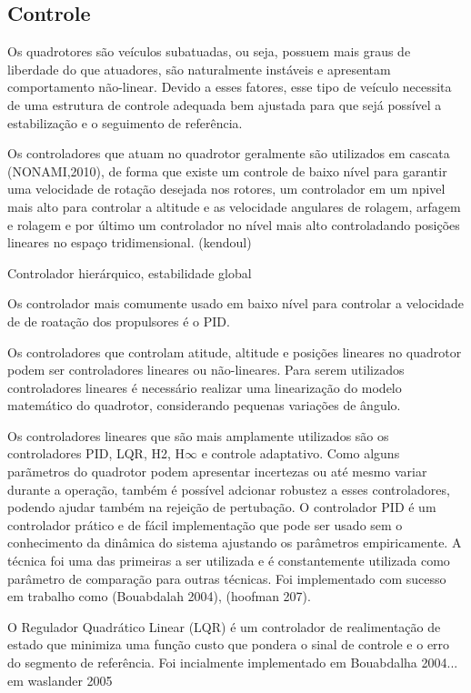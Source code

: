 \subsection{Controle}
Os quadrotores são veículos subatuadas, ou seja, possuem mais graus de liberdade do que atuadores, são naturalmente instáveis e apresentam comportamento não-linear. Devido a esses fatores, esse tipo de veículo necessita de uma estrutura de controle adequada bem ajustada para que sejá possível a estabilização e o seguimento de referência.

Os controladores que atuam no quadrotor geralmente são utilizados em cascata (NONAMI,2010), de forma que existe um controle de baixo nível para garantir uma velocidade de rotação desejada nos rotores, um controlador em um npivel mais alto para controlar a altitude e as velocidade angulares de rolagem, arfagem e rolagem e por último um controlador no nível mais alto controladando posições lineares no espaço tridimensional. (kendoul)

Controlador hierárquico, estabilidade global

Os controlador mais comumente usado em baixo nível para controlar a velocidade de de roatação dos propulsores é o PID. 

Os controladores que controlam atitude, altitude e posições lineares no quadrotor podem ser controladores lineares ou não-lineares. Para serem utilizados controladores lineares é necessário realizar uma linearização do modelo matemático do quadrotor, considerando pequenas variações de ângulo.

Os controladores lineares que são mais amplamente utilizados são os controladores PID, LQR, H2, H$\infty$ e controle adaptativo. Como alguns parãmetros do quadrotor podem apresentar incertezas ou até mesmo variar durante a operação, também é possível adcionar robustez a esses controladores, podendo ajudar também na rejeição de pertubação. O controlador PID é um controlador prático e de fácil implementação que pode ser usado sem o conhecimento da dinâmica do sistema ajustando os parâmetros empiricamente. A técnica foi uma das primeiras a ser utilizada e é constantemente utilizada como parâmetro de comparação para outras técnicas. Foi implementado com sucesso em trabalho como (Bouabdalah 2004), (hoofman 207).

O Regulador Quadrático Linear (LQR) é um controlador de realimentação de estado que minimiza uma função custo que pondera o sinal de controle e o erro do segmento de referência. Foi incialmente implementado em Bouabdalha 2004... em waslander 2005 

